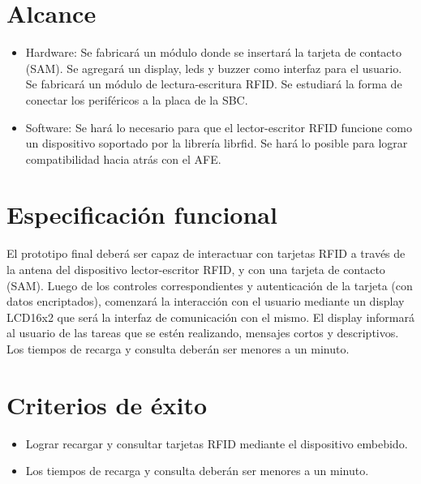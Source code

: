 \section{Alcance}

\begin{itemize}

\item Hardware: Se fabricar\'a un m\'odulo donde se insertar\'a la tarjeta de contacto (SAM).
Se agregar\'a un display, leds y buzzer como interfaz para el usuario. Se fabricar\'a un m\'odulo de lectura-escritura RFID. Se estudiar\'a la forma de conectar los perif\'ericos a la placa de la SBC.

\item Software: Se har\'a lo necesario para que el lector-escritor RFID funcione como un dispositivo soportado por la librer\'ia librfid. Se hará lo posible para lograr compatibilidad hacia atrás con el AFE.
    
\end{itemize}

\section{Especificaci\'on funcional}

El prototipo final deber\'a ser capaz de interactuar con tarjetas RFID a trav\'es de la antena del dispositivo lector-escritor RFID, y con una tarjeta de contacto (SAM). Luego de los controles correspondientes y autenticaci\'on de la tarjeta (con datos encriptados), comenzar\'a la interacci\'on con el usuario mediante un display LCD16x2 que ser\'a la interfaz de comunicaci\'on con el mismo. El display informar\'a al usuario de las tareas que se est\'en realizando, mensajes cortos y descriptivos. Los tiempos de recarga y consulta deber\'an ser menores a un minuto.

\section{Criterios de \'exito}

\begin{itemize}

\item Lograr recargar y consultar tarjetas RFID mediante el dispositivo embebido.

\item Los tiempos de recarga y consulta deber\'an ser menores a un minuto.

\end{itemize}